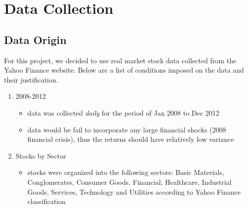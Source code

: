 \documentclass{article}
\begin{document}
\section{Data Collection}

\subsection{Data Origin}
For this project, we decided to use real market stock data collected from the Yahoo Finance website. Below are a list of conditions imposed on the data and their justification. 
\begin{enumerate}
\item 2008-2012
\begin{itemize}
\item data was collected \textit{daily} for the period of Jan 2008 to Dec 2012
\item data would be fail to incorporate any large financial shocks (2008 financial crisis), thus the returns should have relatively low variance
\end{itemize}
\item Stocks by Sector
\begin{itemize}
\item stocks were organized into the following sectors: Basic Materials, Conglomerates, Consumer Goods, Financial, Healthcare, Industrial Goods, Services, Technology and Utilities according to Yahoo Finance classification
\end{itemize}
\end{enumerate}
\end{document}
